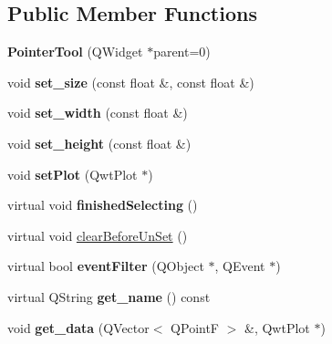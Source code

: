 \subsection*{Public Member Functions}
\begin{DoxyCompactItemize}
\item 
\mbox{\label{classPointerTool_ad40ae55e67021175db7b749a163f428b}} 
{\bfseries Pointer\+Tool} (Q\+Widget $\ast$parent=0)
\item 
\mbox{\label{classPointerTool_a66ba22cda0710f26e84fac942157c316}} 
void {\bfseries set\+\_\+size} (const float \&, const float \&)
\item 
\mbox{\label{classPointerTool_a44797227fc09fff30a4ac7ab1e38ef82}} 
void {\bfseries set\+\_\+width} (const float \&)
\item 
\mbox{\label{classPointerTool_ad069a930adfd400c9802366f2f270422}} 
void {\bfseries set\+\_\+height} (const float \&)
\item 
\mbox{\label{classPointerTool_a96e38dd0c6beb7cc4f33b031e311f6d6}} 
void {\bfseries set\+Plot} (Qwt\+Plot $\ast$)
\item 
\mbox{\label{classPointerTool_acec8781a7d4b55c143d2047a40c88ff9}} 
virtual void {\bfseries finished\+Selecting} ()
\item 
virtual void \mbox{\hyperlink{classPointerTool_a04c325128dc9ee27272eace9e70d15aa}{clear\+Before\+Un\+Set}} ()
\item 
\mbox{\label{classTool_a020bd5757a03ea7321848a3874f3a8cb}} 
virtual bool {\bfseries event\+Filter} (Q\+Object $\ast$, Q\+Event $\ast$)
\item 
\mbox{\label{classTool_aa30c64915020a71d0ea8650e8e966336}} 
virtual Q\+String {\bfseries get\+\_\+name} () const
\item 
\mbox{\label{classTool_a507adfcdafc818d9628b952001b93f3c}} 
void {\bfseries get\+\_\+data} (Q\+Vector$<$ Q\+PointF $>$ \&, Qwt\+Plot $\ast$)
\end{DoxyCompactItemize}
